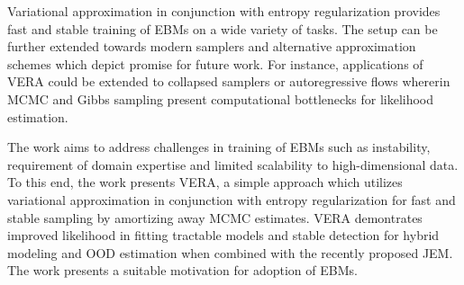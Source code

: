 \documentclass[11pt,letterpaper]{article}
\begin{document}
Variational approximation in conjunction with entropy regularization provides fast and stable training of EBMs on a wide variety of tasks. The setup can be further extended towards modern samplers and alternative approximation schemes which depict promise for future work. For instance, applications of VERA could be extended to collapsed samplers or autoregressive flows whererin MCMC and Gibbs sampling present computational bottlenecks for likelihood estimation. 

The work aims to address challenges in training of EBMs such as instability, requirement of domain expertise and limited scalability to high-dimensional data. To this end, the work presents VERA, a simple approach which utilizes variational approximation in conjunction with entropy regularization for fast and stable sampling by amortizing away MCMC estimates. VERA demontrates improved likelihood in fitting tractable models and stable detection for hybrid modeling and OOD estimation when combined with the recently proposed JEM. The work presents a suitable motivation for adoption of EBMs. 
\end{document}
